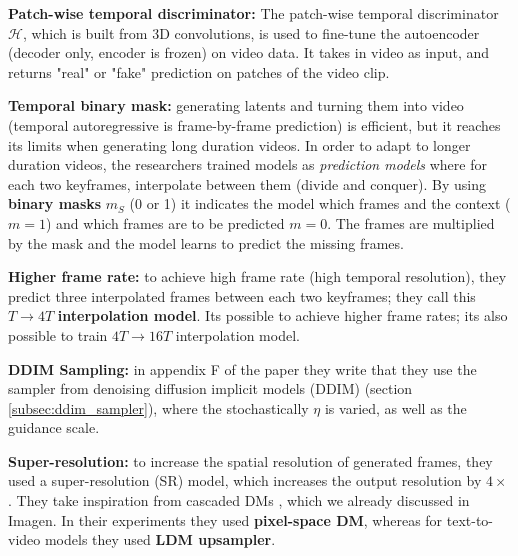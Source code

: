 \textbf{Patch-wise temporal discriminator:} The patch-wise temporal discriminator $\mathcal{H}$, which is built from 3D convolutions, is used to fine-tune the autoencoder (decoder only, encoder is frozen) on video data. It takes in video as input, and returns "real" or "fake" prediction on patches of the video clip.

\textbf{Temporal binary mask:} generating latents and turning them into video (temporal autoregressive is frame-by-frame prediction) is efficient, but it reaches its limits when generating long duration videos. In order to adapt to longer duration videos, the researchers trained models as \textit{prediction models} where for each two keyframes, interpolate between them (divide and conquer). By using \textbf{binary masks} $m_S$ (0 or 1) it indicates the model which frames and the context ($m = 1$) and which frames are to be predicted $m = 0$. The frames are multiplied by the mask and the model learns to predict the missing frames.

\textbf{Higher frame rate:} to achieve high frame rate (high temporal resolution), they predict three interpolated frames between each two keyframes; they call this $T \rightarrow 4T$ \textbf{interpolation model}. Its possible to achieve higher frame rates; its also possible to train $4T \rightarrow 16T$ interpolation model.

\textbf{DDIM Sampling:} in appendix F of the paper they write that they use the sampler from denoising diffusion implicit models (DDIM) \cite{ddim} (section \ref{subsec:ddim_sampler}), where the stochastically $\eta$ is varied, as well as the guidance scale.

\textbf{Super-resolution: } to increase the spatial resolution of generated frames, they used a super-resolution (SR) model, which increases the output resolution by $4 \times $. They take inspiration from cascaded DMs \cite{cascaded_diffusion_models}, which we already discussed in Imagen. In their experiments they used \textbf{pixel-space DM}, whereas for text-to-video models they used \textbf{LDM upsampler}. 
